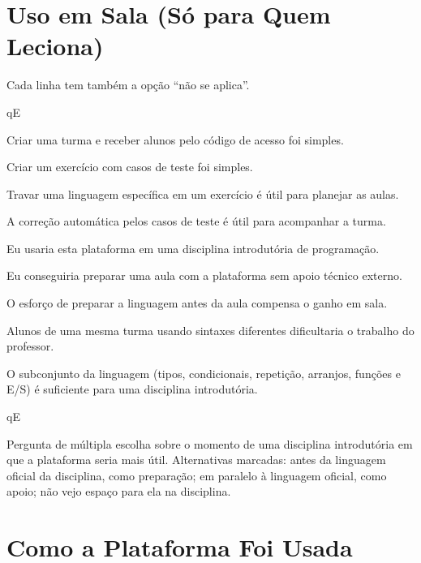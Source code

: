 \section{Uso em Sala (Só para Quem Leciona)}

Cada linha tem também a opção ``não se aplica''.

\begin{questoes}{qE}
    \item\label{qE:sala-ini} Criar uma turma e receber alunos pelo código de acesso foi simples.
    \item Criar um exercício com casos de teste foi simples.
    \item Travar uma linguagem específica em um exercício é útil para planejar as aulas.
    \item A correção automática pelos casos de teste é útil para acompanhar a turma.
    \item Eu usaria esta plataforma em uma disciplina introdutória de programação.
    \item Eu conseguiria preparar uma aula com a plataforma sem apoio técnico externo.
    \item O esforço de preparar a linguagem antes da aula compensa o ganho em sala.
    \item\label{qE:sala-risco} Alunos de uma mesma turma usando sintaxes diferentes dificultaria o trabalho do professor.
    \item\label{qE:subconjunto} O subconjunto da linguagem (tipos, condicionais, repetição, arranjos, funções e E/S) é suficiente para uma disciplina introdutória.
\end{questoes}

\begin{questoes}{qE}
    \item\label{qE:sala-fim} Pergunta de múltipla escolha sobre o momento de uma disciplina introdutória em que a plataforma seria mais útil. Alternativas marcadas: antes da linguagem oficial da disciplina, como preparação; em paralelo à linguagem oficial, como apoio; não vejo espaço para ela na disciplina.
\end{questoes}

\section{Como a Plataforma Foi Usada}


